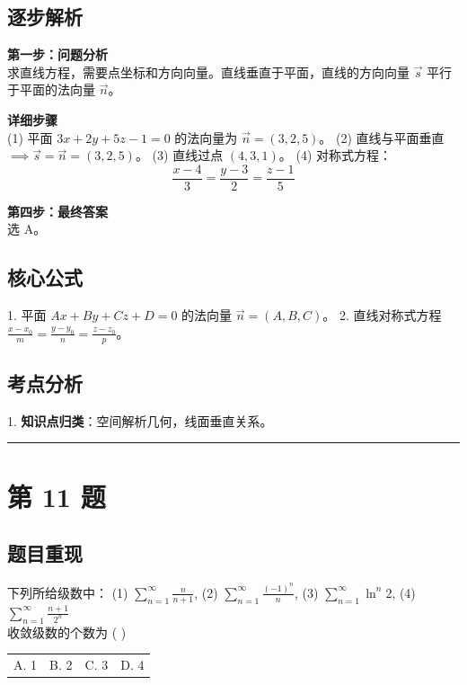 \documentclass[10pt, a4paper]{ctexart}
\newcommand{\problemheader}{
    \vspace{0.5cm}
    \noindent\rule[0.5ex]{\linewidth}{2pt} %
}
\newcommand{\analysisheader}{
    \vspace{0.2cm}
    \noindent{\color{red}\rule[0.5ex]{\linewidth}{0.5pt}} %
    \vspace{0.1cm}
}
\begin{document}
\analysisheader
{\color{red}
\subsection*{逐步解析}
\textbf{第一步：问题分析} \\
求直线方程，需要点坐标和方向向量。直线垂直于平面，直线的方向向量 $\vec{s}$ 平行于平面的法向量 $\vec{n}$。

\textbf{详细步骤} \\
(1) 平面 $3x+2y+5z-1=0$ 的法向量为 $\vec{n} = (3, 2, 5)$。
(2) 直线与平面垂直 $\implies \vec{s} = \vec{n} = (3, 2, 5)$。
(3) 直线过点 $(4, 3, 1)$。
(4) 对称式方程：
\[ \frac{x-4}{3} = \frac{y-3}{2} = \frac{z-1}{5} \]

\textbf{第四步：最终答案} \\
选 A。

\subsection*{核心公式}
1. 平面 $Ax+By+Cz+D=0$ 的法向量 $\vec{n}=(A,B,C)$。
2. 直线对称式方程 $\frac{x-x_0}{m} = \frac{y-y_0}{n} = \frac{z-z_0}{p}$。

\subsection*{考点分析}
1. \textbf{知识点归类}：空间解析几何，线面垂直关系。
}

\problemheader
\section*{第 11 题}
\subsection*{题目重现}
下列所给级数中：
(1) $\sum\limits_{n=1}^\infty \frac{n}{n+1}$, \quad
(2) $\sum\limits_{n=1}^\infty \frac{(-1)^n}{n}$, \quad
(3) $\sum\limits_{n=1}^\infty \ln^n 2$, \quad
(4) $\sum\limits_{n=1}^\infty \frac{n+1}{2^n}$ \\
收敛级数的个数为 ( \quad ) \\
\begin{tabularx}{\linewidth}{@{} *{4}{X} @{}}
    A. 1 & B. 2 & C. 3 & D. 4
\end{tabularx}
\end{document}
